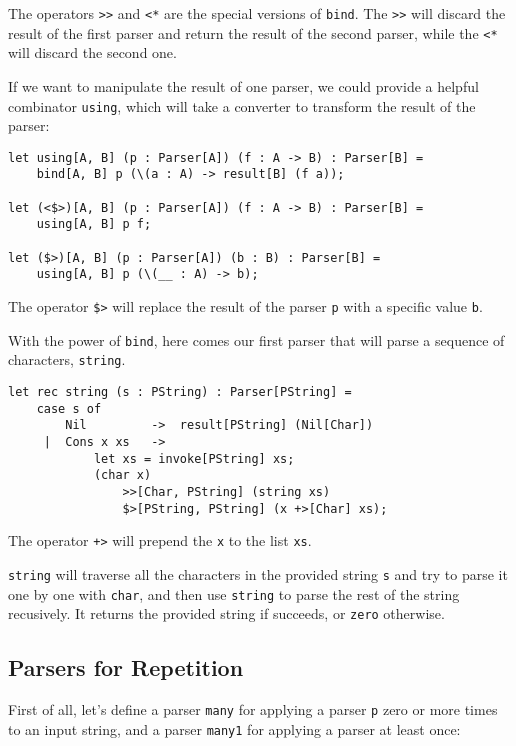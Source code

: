 The operators \texttt{>>} and \texttt{<*} are the special versions of \texttt{bind}. The \texttt{>>} will discard the result of the first parser and return the result of the second parser, while the \texttt{<*} will discard the second one.

If we want to manipulate the result of one parser, we could provide a helpful combinator \texttt{using}, which will take a converter to transform the result of the parser:

\begin{lstlisting}
let using[A, B] (p : Parser[A]) (f : A -> B) : Parser[B] =
    bind[A, B] p (\(a : A) -> result[B] (f a));

let (<$>)[A, B] (p : Parser[A]) (f : A -> B) : Parser[B] =
    using[A, B] p f;

let ($>)[A, B] (p : Parser[A]) (b : B) : Parser[B] =
    using[A, B] p (\(__ : A) -> b);
\end{lstlisting}

The operator \texttt{\$>} will replace the result of the parser \texttt{p} with a specific value \texttt{b}.

With the power of \texttt{bind}, here comes our first parser that will parse a sequence of characters, \texttt{string}.

\begin{lstlisting}
let rec string (s : PString) : Parser[PString] =
    case s of
        Nil         ->  result[PString] (Nil[Char])
     |  Cons x xs   ->
            let xs = invoke[PString] xs;
            (char x)
                >>[Char, PString] (string xs)
                $>[PString, PString] (x +>[Char] xs);
\end{lstlisting}

The operator \texttt{+>} will prepend the \texttt{x} to the list \texttt{xs}.

\texttt{string} will traverse all the characters in the provided string \texttt{s} and try to parse it one by one with \texttt{char}, and then use \texttt{string} to parse the rest of the string recusively. It returns the provided string if succeeds, or \texttt{zero} otherwise.

\subsection{Parsers for Repetition}

First of all, let's define a parser \texttt{many} for applying a parser \texttt{p} zero or more times to an input string, and a parser \texttt{many1} for applying a parser at least once:

